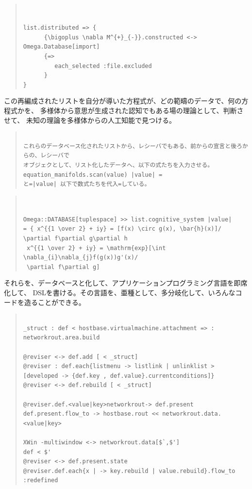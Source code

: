 \documentclass{jsarticle}
\begin{document}
\begin{quote}
\setlength{\baselineskip}{12pt}
\begin{verbatim}


list.distributed => {
      {\bigoplus \nabla M^{+}_{-}}.constructed <-> Omega.Database[import]                 
      {=>
         each_selected :file.excluded
      }
}
\end{verbatim}
\end{quote}

                      
この再編成されたリストを自分が導いた方程式が、どの範疇のデータで、何の方程式かを、
多様体から意思が生成された認知でもある場の理論として、判断させて、
未知の理論を多様体からの人工知能で見つける。

\begin{quote}
\setlength{\baselineskip}{12pt}
\begin{verbatim}

これらのデータベース化されたリストから、レシーバでもある、前からの宣言と後ろからの、レシーバで
オブジェクとして、リスト化したデータへ、以下の式たちを入力させる。equation_manifolds.scan(value) |value| = 
と=|value| 以下で数式たちを代入=している。
\end{verbatim}
\end{quote}

\begin{quote}
\setlength{\baselineskip}{12pt}
\begin{verbatim}


Omega::DATABASE[tuplespace] >> list.cognitive_system |value| 
= { x^{{1 \over 2} + iy} = [f(x) \circ g(x), \bar{h}(x)]/ \partial f\partial g\partial h 
 x^{{1 \over 2} + iy} = \mathrm{exp}[\int \nabla_{i}\nabla_{j}f(g(x))g'(x)/
 \partial f\partial g] 

\end{verbatim}
\end{quote}

それらを、データベースと化して、アプリケーションプログラミング言語を即席化して、
DSLを書ける。その言語を、亜種として、多分岐化して、いろんなコードを造ることができる。

\begin{quote}
\setlength{\baselineskip}{12pt}
\begin{verbatim}

_struct : def < hostbase.virtualmachine.attachment => : networkrout.area.build

@reviser <-> def.add [ < _struct]
@reviser : def.each{listmenu -> listlink | unlinklist > [developed -> {def.key , def.value}.currentconditions]}
@reviser <-> def.rebuild [ < _struct]

@reviser.def.<value|key>networkrout-> def.present
def.present.flow_to -> hostbase.rout << networkrout.data.<value|key>

XWin -multiwindow <-> networkrout.data[$`,$']
def < $'
@reviser <-> def.present.state
@reviser.def.each{x | -> key.rebuild | value.rebuild}.flow_to :redefined

\end{verbatim}
\end{quote}
\end{document}
